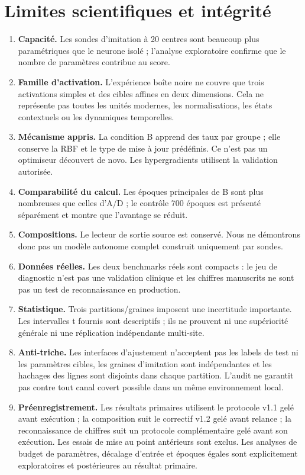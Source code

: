 \documentclass[11pt,a4paper]{article}
\begin{document}
\section{Limites scientifiques et intégrité}
\begin{enumerate}[leftmargin=1.15cm]
\item \textbf{Capacité.} Les sondes d'imitation à 20 centres sont beaucoup plus paramétriques que le neurone isolé ; l'analyse exploratoire confirme que le nombre de paramètres contribue au score.
\item \textbf{Famille d'activation.} L'expérience boîte noire ne couvre que trois activations simples et des cibles affines en deux dimensions. Cela ne représente pas toutes les unités modernes, les normalisations, les états contextuels ou les dynamiques temporelles.
\item \textbf{Méca­nisme appris.} La condition B apprend des taux par groupe ; elle conserve la RBF et le type de mise à jour prédéfinis. Ce n'est pas un optimiseur découvert de novo. Les hypergradients utilisent la validation autorisée.
\item \textbf{Comparabilité du calcul.} Les époques principales de B sont plus nombreuses que celles d'A/D ; le contrôle 700 époques est présenté séparément et montre que l'avantage se réduit.
\item \textbf{Compositions.} Le lecteur de sortie source est conservé. Nous ne démontrons donc pas un modèle autonome complet construit uniquement par sondes.
\item \textbf{Données réelles.} Les deux benchmarks réels sont compacts : le jeu de diagnostic n’est pas une validation clinique et les chiffres manuscrits ne sont pas un test de reconnaissance en production.
\item \textbf{Statistique.} Trois partitions/graines imposent une incertitude importante. Les intervalles t fournis sont descriptifs ; ils ne prouvent ni une supériorité générale ni une réplication indépendante multi-site.
\item \textbf{Anti-triche.} Les interfaces d'ajustement n'acceptent pas les labels de test ni les paramètres cibles, les graines d'imitation sont indépendantes et les hachages des lignes sont disjoints dans chaque partition. L'audit ne garantit pas contre tout canal covert possible dans un même environnement local.
\item \textbf{Préenregistrement.} Les résultats primaires utilisent le protocole v1.1 gelé avant exécution ; la composition suit le correctif v1.2 gelé avant relance ; la reconnaissance de chiffres suit un protocole complémentaire gelé avant son exécution. Les essais de mise au point antérieurs sont exclus. Les analyses de budget de paramètres, décalage d'entrée et époques égales sont explicitement exploratoires et postérieures au résultat primaire.

\end{enumerate}
\end{document}
